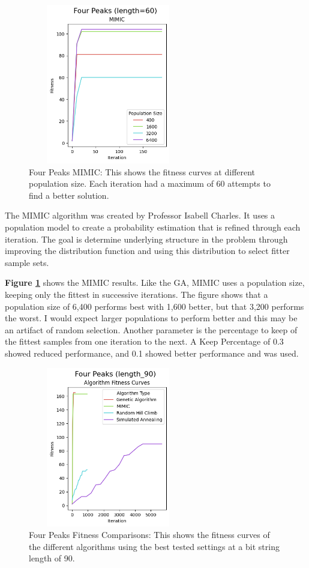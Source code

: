 \documentclass[letterpaper]{article} %
\begin{document}
\begin{figure}[!htb]
\centering
\includegraphics[width=2.75in, height=2.75in]{figures/Four_Peaks_length=60_MIMIC_l_60_ma_60_p_400__1600__3200__6400_k_0.1_.png}
\caption{Four Peaks MIMIC:  This shows the fitness curves at different population size. Each iteration had a maximum of 60 attempts to find a better solution. }
\label{fig:four_peaks_mimic}
\end{figure}

The MIMIC algorithm was created by Professor Isabell Charles.  It uses a population model to create a probability estimation that is refined through each iteration.  The goal is determine underlying structure in the problem through improving the distribution function and using this distribution to select fitter sample sets.

\textbf{Figure \ref{fig:four_peaks_mimic}} shows the MIMIC results.  Like the GA, MIMIC uses a population size, keeping only the fittest in successive iterations.  The figure shows that a population size of 6,400 performs best with 1,600 better, but that 3,200 performs the worst.  I would expect larger populations to perform better and this may be an artifact of random selection. Another parameter is the percentage to keep of the fittest samples from one iteration to the next.  A Keep Percentage of 0.3 showed reduced performance, and 0.1 showed better performance and was used. 

\begin{figure}[!htb]
\centering
\includegraphics[width=2.75in, height=2.75in]{figures/Four_Peaks_length_90_Algorithm_Fitness_Curves_.png}
\caption{Four Peaks Fitness Comparisons: This shows the fitness curves of the different algorithms using the best tested settings at a bit string length of 90.  }
\label{fig:four_peaks_fitness_comparison_90}
\end{figure}
\end{document}
